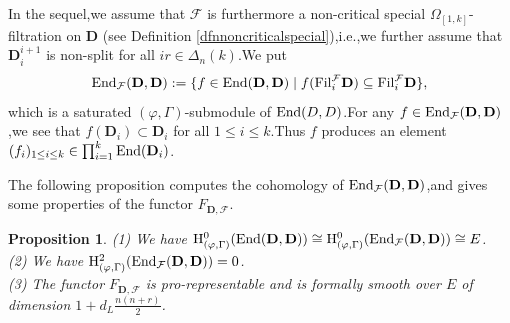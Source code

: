 \documentclass[SecEq,CM,GP]{degruyter-crelle} %
\theoremstyle{plain}
\newtheorem{pro}[thm]{Proposition}
\newcommand{\Dpik}{{\mathbf{D}}}
\newcommand{\EndO}{{\rm End}}
\newcommand{\fil}{{\rm Fil}}
\newcommand{\hH}{{\mathrm{H}}}
\newcommand{\omepik}{\Omega_{[1,k]}}
\newcommand{\cF}{\mathcal F}
\begin{document}
In the sequel,\;we assume that $\cF$ is furthermore a non-critical special  $\omepik$-filtration on $\Dpik$ (see Definition \ref{dfnnoncriticalspecial}),\;i.e.,\;we further assume that $\Dpik^{i+1}_{i}$ is non-split for all $ir\in\Delta_n(k)$.\;We put
\[\EndO_{\cF}(\Dpik,\Dpik):=\{f\in \EndO(\Dpik,\Dpik)\;|\;f(\fil_i^{\cF}\Dpik)\subseteq \fil_i^{\cF}\Dpik\},\]
which is a saturated $(\varphi,\Gamma)$-submodule of $\EndO(D,D)$.\;For any $f\in \EndO_{\cF}(\Dpik,\Dpik)$,\;we see that $f(\Dpik_i)\subset \Dpik_i$ for all $1\leq i\leq k$.\;Thus $f$ produces an element $(f_i)_{1\leq i\leq k}\in \prod_{i=1}^k\EndO(\Dpik_i)$.\;

The following proposition computes the cohomology of $\EndO_{\cF}(\Dpik,\Dpik)$,\;and gives some properties of the functor  $F_{\Dpik,\cF}$.\;

\begin{pro}\label{dimlemmaDpik}
(1) We have $\hH^0_{(\varphi,\Gamma)}(\EndO(\Dpik,\Dpik))\cong\hH^0_{(\varphi,\Gamma)}(\EndO_{\cF}(\Dpik,\Dpik))\cong E$.\;\\
(2) We have  $\hH^2_{(\varphi,\Gamma)}(\EndO_{\cF}(\Dpik,\Dpik))=0$.\;\\
(3) The functor  $F_{\Dpik,\cF}$ is pro-representable and is formally smooth over $E$ of dimension  $1+d_L\frac{n(n+r)}{2}$.\;
\end{pro}
\end{document}

